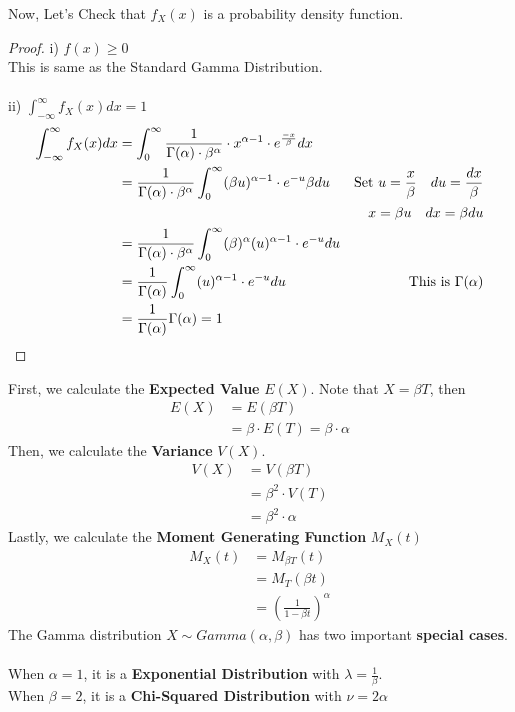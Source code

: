 \documentclass[11pt,oneside]{book}
\theoremstyle{break}
\theoremstyle{break}
\begin{document}
Now, Let's Check that $f_X(x)$ is a probability density function. \begin{proof}
i) $f(x)\geq 0$\\
This is same as the Standard Gamma Distribution.\\
\hfill\\
ii) $\int_{-\infty}^{\infty}f_X(x)dx=1$\begin{align*}
\int_{-\infty}^{\infty}f_X(x)dx&=\int_{0}^{\infty} \frac{1}{\Gamma(\alpha)\cdot \beta^{\alpha}}\cdot x^{\alpha-1}\cdot e^{\frac{-x}{\beta}}dx\\
&=\frac{1}{\Gamma(\alpha)\cdot \beta^{\alpha}}\int_{0}^{\infty}  (\beta u)^{\alpha-1}\cdot e^{-u}\beta du &\text{Set }u=\frac{x}{\beta}\text{\quad }du=\frac{dx}{\beta}\\
&&x=\beta u\text{\quad} dx=\beta du\\
&=\frac{1}{\Gamma(\alpha)\cdot \beta^{\alpha}}\int_{0}^{\infty}  (\beta)^{\alpha}(u)^{\alpha-1}\cdot e^{-u}du\\
&=\frac{1}{\Gamma(\alpha)}\int_{0}^{\infty} (u)^{\alpha-1}\cdot e^{-u}du&\text{This is }\Gamma(\alpha)  \\
&=\frac{1}{\Gamma(\alpha)}\Gamma(\alpha)=1
\end{align*}
\end{proof}
First, we calculate the \textbf{Expected Value} $E(X)$. Note that $X=\beta T$, then \begin{align*}
E(X)&=E(\beta T)\\
&=\beta \cdot E(T)=\beta \cdot \alpha
\end{align*}
Then, we calculate the \textbf{Variance} $V(X)$. \begin{align*}
V(X)&=V(\beta T)\\
&=\beta^2\cdot V(T)\\
&=\beta^2\cdot \alpha
\end{align*}
Lastly, we calculate the \textbf{Moment Generating Function} $M_X(t)$\begin{align*}
M_X(t)&=M_{\beta T}(t)\\
&=M_T(\beta t)\\
&=\left(\frac{1}{1-\beta t} \right)^{\alpha}
\end{align*}
The Gamma distribution $X\sim Gamma(\alpha,\beta)$ has two important \textbf{special cases}.\\
\hfill\\
When $\alpha=1$, it is a \textbf{Exponential Distribution} with $\lambda = \frac{1}{\beta}$.\\
When $\beta =2$, it is a \textbf{Chi-Squared Distribution} with $\nu=2\alpha$\\
\hfill\\
\end{document}
